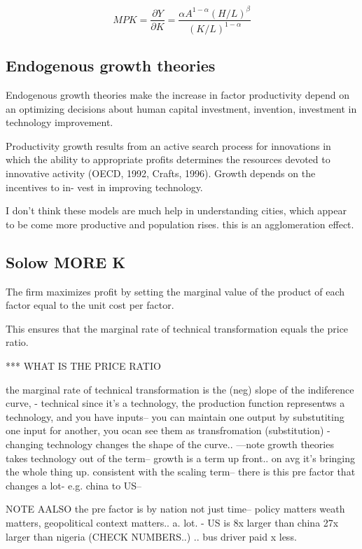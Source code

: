     \[ MPK={\frac {\partial Y}{\partial K}}=\frac {\alpha A^{1-\alpha }(H/L)^{\beta }}{(K/L)^{1-\alpha} }\]
 
 \subsection{Endogenous growth theories}  
 Endogenous growth theories make the increase in factor productivity depend on an optimizing decisions about human capital investment, invention, investment in technology improvement.  
 
  Productivity growth results from an active search process for innovations in
which the ability to appropriate profits determines the resources devoted to
innovative activity (OECD, 1992, Crafts, 1996). Growth depends on the incentives to in-
vest in improving technology.%
 
  I don't think these models are much help in understanding cities, which appear to be come more productive and population rises. this is an agglomeration effect.



\subsection{Solow MORE K}

The firm maximizes profit by setting the marginal value of the product of each factor equal to the unit cost per factor. 

This ensures that the marginal rate of technical transformation equals the price ratio. 

*** WHAT IS THE PRICE RATIO

the marginal rate of technical transformation is the (neg) slope of the indiference curve, 
- technical since it's a technology, the production function representws a technology, and you have inputs-- you can maintain one output by substutiting one input for another, you ocan see them as transfromation (substitution)
- changing technology changes the shape of the curve.. ---note growth theories takes technology out of the term-- growth is a term up front.. on avg it's bringing the whole thing up. consistent with the scaling term-- there is this pre factor that changes a lot- e.g. china to US-- 

NOTE AALSO  the pre factor is by nation not just time-- policy matters weath matters, geopolitical context matters.. a. lot. - US is 8x larger than china 27x larger than nigeria (CHECK NUMBERS..) .. bus driver paid x less.


